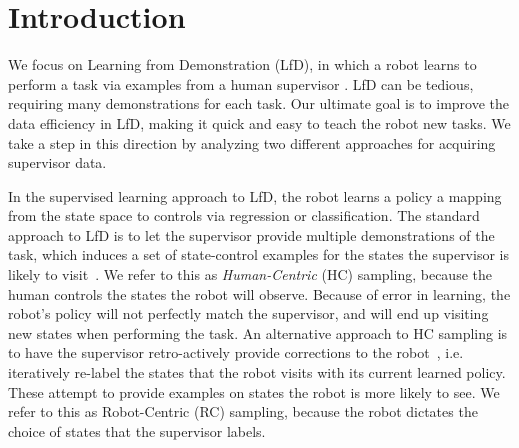 \documentclass[10pt, conference]{ieeeconf}      %
\begin{document}
\section{Introduction} 
We focus on Learning from Demonstration (LfD), in which a robot learns to perform a task via examples from a human supervisor \cite{abbeel2008apprenticeship,argall2009survey,ross2010reduction,laskeyshiv}.  LfD can be tedious, requiring many demonstrations for each task. Our ultimate goal is to improve the data efficiency in LfD, making it quick and easy to teach the robot new tasks. We take a step in this direction by analyzing two different approaches for acquiring supervisor data. 

In the supervised learning approach to LfD, the robot learns a policy a mapping from the state space to controls  via regression or classification. The standard approach to LfD is to let the supervisor provide multiple demonstrations of the task, which induces a set of state-control examples for the states the supervisor is likely to visit~\cite{pomerleau1989alvinn}. We refer to this as \emph{Human-Centric} (HC) sampling, because the human controls the states the robot will observe. Because of error in learning, the robot's policy will not perfectly match the supervisor, and will end up visiting new states when performing the task. An alternative approach to HC sampling is to have the supervisor retro-actively provide corrections to the robot~\cite{ross2010efficient,ross2010reduction,laskeyrobot,laskeyshiv,he2012imitation}, i.e. iteratively re-label the states that the robot visits with its current learned policy.
These attempt to provide examples on states the robot is more likely to see.
We refer to this as Robot-Centric (RC) sampling, because the robot dictates the choice of states that the supervisor labels.
\end{document}
